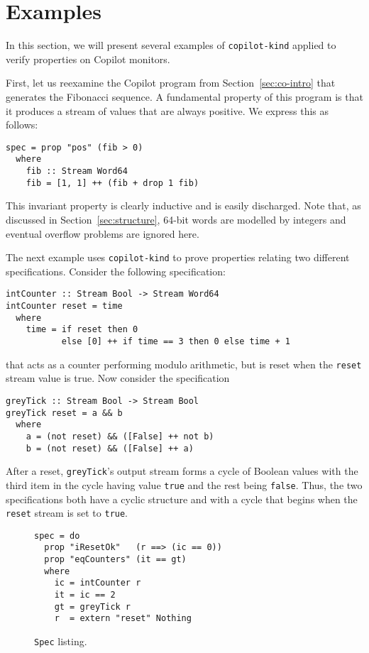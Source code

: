 \section{Examples}\label{sec:example}

In this section,  we will present several examples of
\texttt{copilot-kind} applied to verify properties on Copilot
monitors.


 First, let us reexamine the Copilot program from
 Section~\ref{sec:co-intro} that generates the  Fibonacci
 sequence. A fundamental property of this program is that it produces
 a stream of values that are always positive. We express this as follows:
\begin{lstlisting}[frame=single]
spec = prop "pos" (fib > 0)
  where
    fib :: Stream Word64
    fib = [1, 1] ++ (fib + drop 1 fib)
\end{lstlisting}
This  invariant property is clearly inductive and is easily
discharged. Note that, as discussed in Section~\ref{sec:structure}, 
64-bit words are modelled by integers and eventual overflow problems are ignored here.
 
The next example uses \texttt{copilot-kind} to prove properties
relating two different specifications. Consider the following
specification:
\begin{lstlisting}[frame=single, deletekeywords={reset}]
intCounter :: Stream Bool -> Stream Word64
intCounter reset = time
  where 
    time = if reset then 0
           else [0] ++ if time == 3 then 0 else time + 1
\end{lstlisting}
that acts as a counter performing modulo arithmetic, but is
reset when the \texttt{reset} stream value is true.  Now consider the
specification
\begin{lstlisting}[frame=single, deletekeywords={reset}]
greyTick :: Stream Bool -> Stream Bool
greyTick reset = a && b
  where
    a = (not reset) && ([False] ++ not b)
    b = (not reset) && ([False] ++ a)
\end{lstlisting}
After a reset, \texttt{greyTick}'s output stream forms a cycle of
Boolean values with the third item in the cycle having value
\texttt{true} and the rest being \texttt{false}.  Thus, the two
specifications both have a cyclic structure and with a cycle that
begins when the \texttt{reset} stream is set to \texttt{true}.  

\begin{figure}[ht!]
\begin{lstlisting}[frame=single, deletekeywords={gt}]
spec = do
  prop "iResetOk"   (r ==> (ic == 0))
  prop "eqCounters" (it == gt)
  where
    ic = intCounter r
    it = ic == 2
    gt = greyTick r
    r  = extern "reset" Nothing
\end{lstlisting}
  \caption{\texttt{Spec} listing.\label{fig:spec}}
\end{figure}

